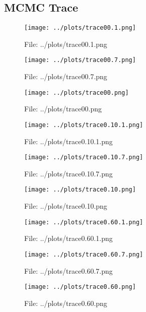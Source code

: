 \documentclass[a4paper, 11pt]{report}
\let\Oldsubsection\subsection
\renewcommand{\subsection}{\FloatBarrier\Oldsubsection}
\begin{document}
\subsection{MCMC Trace}
\begin{figure}[h!] \caption{File: ../plots/trace00.1.png} \texttt{[image: ../plots/trace00.1.png]} \end{figure}
\begin{figure}[h!] \caption{File: ../plots/trace00.7.png} \texttt{[image: ../plots/trace00.7.png]} \end{figure}
\begin{figure}[h!] \caption{File: ../plots/trace00.png} \texttt{[image: ../plots/trace00.png]} \end{figure}
\begin{figure}[h!] \caption{File: ../plots/trace0.10.1.png} \texttt{[image: ../plots/trace0.10.1.png]} \end{figure}
\begin{figure}[h!] \caption{File: ../plots/trace0.10.7.png} \texttt{[image: ../plots/trace0.10.7.png]} \end{figure}
\begin{figure}[h!] \caption{File: ../plots/trace0.10.png} \texttt{[image: ../plots/trace0.10.png]} \end{figure}
\begin{figure}[h!] \caption{File: ../plots/trace0.60.1.png} \texttt{[image: ../plots/trace0.60.1.png]} \end{figure}
\begin{figure}[h!] \caption{File: ../plots/trace0.60.7.png} \texttt{[image: ../plots/trace0.60.7.png]} \end{figure}
\begin{figure}[h!] \caption{File: ../plots/trace0.60.png} \texttt{[image: ../plots/trace0.60.png]} \end{figure}
\end{document}
